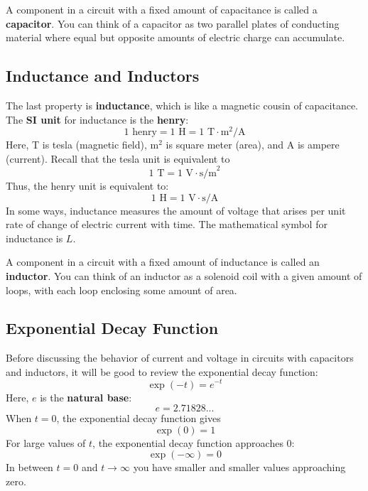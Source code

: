 A component in a circuit with a fixed amount of capacitance is called a \textbf{capacitor}. You can think of a capacitor as two parallel plates of conducting material where equal but opposite amounts of electric charge can accumulate.
\subsection{Inductance and Inductors}
The last property is \textbf{inductance}, which is like a magnetic cousin of capacitance. The \textbf{SI unit} for inductance is the \textbf{henry}:
\begin{equation}
	1 \text{ henry} = 1 \text{ H} = 1 \text{ T}\cdot\text{m}^{2}\text{/A}
\end{equation}
Here, T is tesla (magnetic field), m$^{2}$ is square meter (area), and A is ampere (current). Recall that the tesla unit is equivalent to
\begin{equation}
    1 \text{ T} = 1 \text{ V} \cdot \text{s/m}^{2}
\end{equation}
Thus, the henry unit is equivalent to:
\begin{equation}
    1 \text{ H} = 1 \text{ V}\cdot\text{s/A}
\end{equation}
In some ways, inductance measures the amount of voltage that arises per unit rate of change of electric current with time. The mathematical symbol for inductance is $L$.

A component in a circuit with a fixed amount of inductance is called an \textbf{inductor}. You can think of an inductor as a solenoid coil with a given amount of loops, with each loop enclosing some amount of area.
\subsection{Exponential Decay Function}
Before discussing the behavior of current and voltage in circuits with capacitors and inductors, it will be good to review the exponential decay function:
\begin{equation}
    \exp(-t) = e^{-t}
\end{equation}
Here, $e$ is the \textbf{natural base}:
\begin{equation}
    e = 2.71828...
\end{equation}
When $t = 0$, the exponential decay function gives
\begin{equation}
    \exp(0) = 1
\end{equation}
For large values of $t$, the exponential decay function approaches 0:
\begin{equation}
    \exp(-\infty) = 0
\end{equation}
In between $t = 0$ and $t \rightarrow \infty$ you have smaller and smaller values approaching zero.

